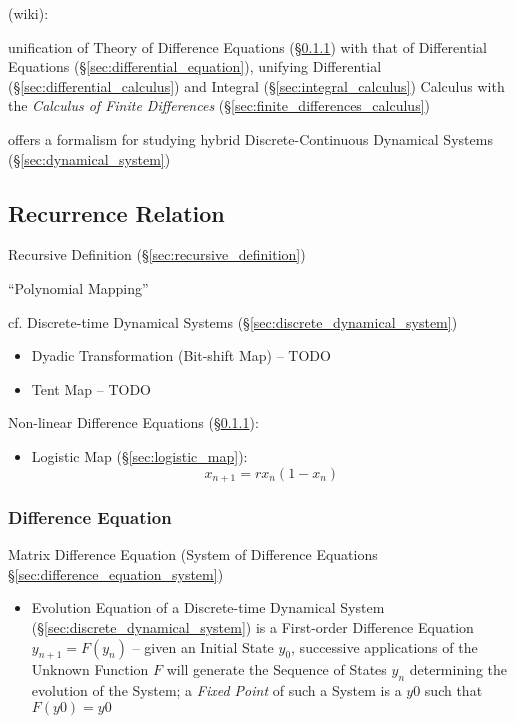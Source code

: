 (wiki):

unification of Theory of Difference Equations (\S\ref{sec:difference_equation})
with that of Differential Equations (\S\ref{sec:differential_equation}),
unifying Differential (\S\ref{sec:differential_calculus}) and Integral
(\S\ref{sec:integral_calculus}) Calculus with the \emph{Calculus of Finite
  Differences} (\S\ref{sec:finite_differences_calculus})

offers a formalism for studying hybrid Discrete-Continuous Dynamical Systems
(\S\ref{sec:dynamical_system})



\subsection{Recurrence Relation}\label{sec:recurrence_relation}

Recursive Definition (\S\ref{sec:recursive_definition})

``Polynomial Mapping''

\fist cf. Discrete-time Dynamical Systems
(\S\ref{sec:discrete_dynamical_system})

\begin{itemize}
  \item Dyadic Transformation (Bit-shift Map) -- TODO
  \item Tent Map -- TODO
\end{itemize}

Non-linear Difference Equations (\S\ref{sec:difference_equation}):
\begin{itemize}
  \item Logistic Map (\S\ref{sec:logistic_map}):\[
    x_{n+1} = rx_n(1-x_n)
  \]
\end{itemize}



\subsubsection{Difference Equation}\label{sec:difference_equation}

\fist Matrix Difference Equation (System of Difference Equations
\S\ref{sec:difference_equation_system})

\begin{itemize}
  \item Evolution Equation of a Discrete-time Dynamical System
    (\S\ref{sec:discrete_dynamical_system}) is a First-order Difference Equation
    $y_{n+1} = F(y_n)$ -- given an Initial State $y_0$, successive applications
    of the Unknown Function $F$ will generate the Sequence of States $y_n$
    determining the evolution of the System; a \emph{Fixed Point} of such a
    System is a $y0$ such that $F(y0) = y0$
\end{itemize}

